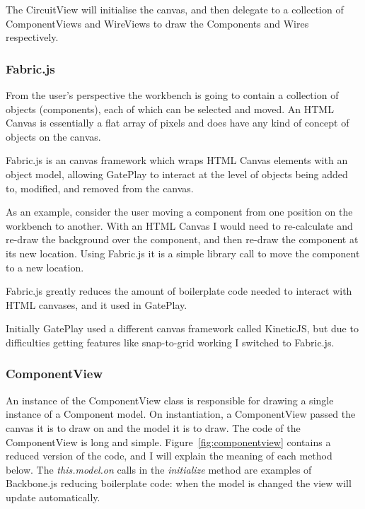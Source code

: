 The CircuitView will initialise the canvas, and then delegate to a collection of ComponentViews and WireViews to draw the Components and Wires respectively.

\subsubsection{Fabric.js}
From the user's perspective the workbench is going to contain a collection of objects (components), each of which can be selected and moved. An HTML Canvas is essentially a flat array of pixels and does have any kind of concept of objects on the canvas.

Fabric.js is an canvas framework which wraps HTML Canvas elements with an object model, allowing GatePlay to interact at the level of objects being added to, modified, and removed from the canvas.

As an example, consider the user moving a component from one position on the workbench to another. With an HTML Canvas I would need to re-calculate and re-draw the background over the component, and then re-draw the component at its new location. Using Fabric.js it is a simple library call to move the component to a new location.

Fabric.js greatly reduces the amount of boilerplate code needed to interact with HTML canvases, and it used in GatePlay.

Initially GatePlay used a different canvas framework called KineticJS, but due to difficulties getting features like snap-to-grid working I switched to Fabric.js.

\subsubsection{ComponentView}
An instance of the ComponentView class is responsible for drawing a single instance of a Component model. On instantiation, a ComponentView passed the canvas it is to draw on and the model it is to draw. The code of the ComponentView is long and simple. Figure~\ref{fig:componentview} contains a reduced version of the code, and I will explain the meaning of each method below. The \textit{this.model.on} calls in the \textit{initialize} method are examples of Backbone.js reducing boilerplate code: when the model is changed the view will update automatically.


